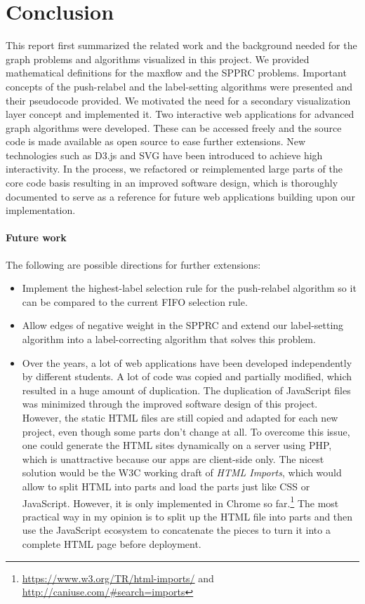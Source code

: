 \chapter{Conclusion}\label{ch:6}
This report first summarized the related work and the background needed for the graph problems and algorithms visualized in this project.
We provided mathematical definitions for the maxflow and the SPPRC problems. Important concepts of the push-relabel and the label-setting algorithms were presented and their pseudocode provided.
We motivated the need for a secondary visualization layer concept and implemented it.
Two interactive web applications for advanced graph algorithms were developed.
These can be accessed freely and the source code is made available as open source to ease further extensions. 
New technologies such as D3.js and SVG have been introduced to achieve high interactivity. 
In the process, we refactored or reimplemented large parts of the core code basis resulting in an improved software design, which is thoroughly documented to serve as a reference for future web applications building upon our implementation.

\subsubsection{Future work}
The following are possible directions for further extensions:
\begin{itemize}
	\item Implement the highest-label selection rule for the push-relabel algorithm so it can be compared to the current FIFO selection rule.
	\item Allow edges of negative weight in the SPPRC and extend our label-setting algorithm into a label-correcting algorithm that solves this problem.
	\item Over the years, a lot of web applications have been developed independently by different students. A lot of code was copied and partially modified, which resulted in a huge amount of duplication. The duplication of JavaScript files was minimized through the improved software design of this project. However, the static HTML files are still copied and adapted for each new project, even though some parts don't change at all. To overcome this issue, one could generate the HTML sites dynamically on a server using PHP, which is unattractive because our apps are client-side only. The nicest solution would be the W3C working draft of \textit{HTML Imports}, which would allow to split HTML into parts and load the parts just like CSS or JavaScript. However, it is only implemented in Chrome so far.\footnote{\url{https://www.w3.org/TR/html-imports/} and \url{http://caniuse.com/\#search=imports}} The most practical way in my opinion is to split up the HTML file into parts and then use the JavaScript ecosystem to concatenate the pieces to turn it into a complete HTML page before deployment.
\end{itemize}